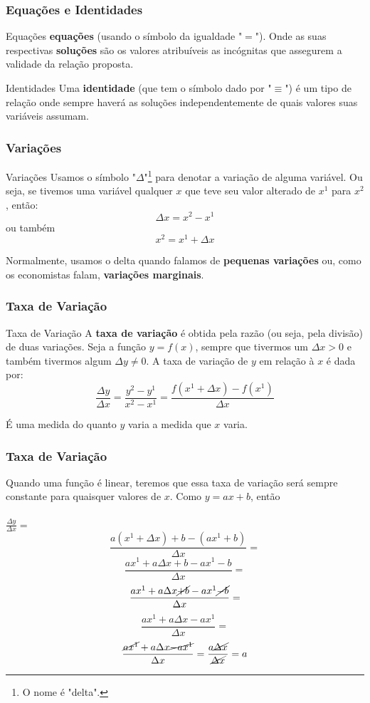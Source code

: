 \documentclass{beamer}[10]
\begin{document}
\begin{frame}
	\frametitle{Equações e Identidades}
		
	\begin{block}{Equações}
		\textbf{equações} (usando o símbolo da igualdade "$=$"). Onde as suas respectivas \textbf{soluções} são os valores atribuíveis as incógnitas que assegurem a validade da relação proposta.
	\end{block}

	\begin{block}{Identidades}
		Uma \textbf{identidade} (que tem o símbolo dado por "$\equiv$") é um tipo de relação onde sempre haverá as soluções independentemente de quais valores suas variáveis assumam.
	\end{block}
\end{frame}

\begin{frame}
	\frametitle{Variações}

	\begin{block}{Variações}
		Usamos o símbolo "$\Delta$"\footnote{O nome é "delta".} para denotar a variação de alguma variável. Ou seja, se tivemos uma variável qualquer $x$ que teve seu valor alterado de $x^1$ para $x^2$, então:
		$$ \Delta x = x^2 - x^1 $$
		ou também
		$$ x^2 = x^1 + \Delta x $$
	\end{block}

	Normalmente, usamos o delta quando falamos de \textbf{pequenas variações} ou, como os economistas falam, \textbf{variações marginais}.
\end{frame}

\begin{frame}
	\frametitle{Taxa de Variação}

	\begin{block}{Taxa de Variação}
		A \textbf{taxa de variação} é obtida pela razão (ou seja, pela divisão) de duas variações. Seja a função $y = f(x)$, sempre que tivermos um $\Delta x > 0$ e também tivermos algum $\Delta y \neq 0$. A taxa de variação de $y$ em relação à $x$ é dada por:
		$$ \frac{\Delta y}{\Delta x} = \frac{y^2 - y^1}{x^2 - x^1} = \frac{f(x^1 + \Delta x) - f(x^1)}{\Delta x} $$
	\end{block}

	É uma medida do quanto $y$ varia a medida que $x$ varia.
\end{frame}

\begin{frame}
	\frametitle{Taxa de Variação}
	Quando uma função é linear, teremos que essa taxa de variação será sempre constante para quaisquer valores de $x$. Como $y = ax + b$, então
	\\~\\
	\Large $ \frac{\Delta y}{\Delta x} = $ \small
	$$ \frac{a(x^1 + \Delta x) + b - (ax^1 + b)}{\Delta x} = $$
	$$ \frac{ax^1 + a\Delta x + b - ax^1 - b}{\Delta x} = $$
	$$ \frac{ax^1 + a\Delta x \cancel{+ b} - ax^1 \cancel{- b}}{\Delta x} = $$
	$$ \frac{ax^1 + a\Delta x - ax^1}{\Delta x} = $$
	$$ \frac{\cancel{ax^1} + a\Delta x \cancel{- ax^1}}{\Delta x} = \frac{a \cancel{\Delta x}}{\cancel{\Delta x}} = a $$
\end{frame}
\end{document}
